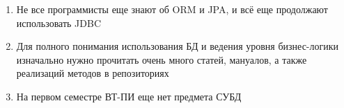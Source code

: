 \begin{enumerate}
	\setlength\itemsep{0em}
	\item Не все программисты еще знают об ORM и JPA, и всё еще продолжают использовать JDBC
	\item Для полного понимания использования БД и ведения уровня бизнес-логики изначально нужно прочитать очень много статей, мануалов, а также реализаций методов в репозиториях 
	\item На первом семестре ВТ-ПИ еще нет предмета СУБД 
\end{enumerate}